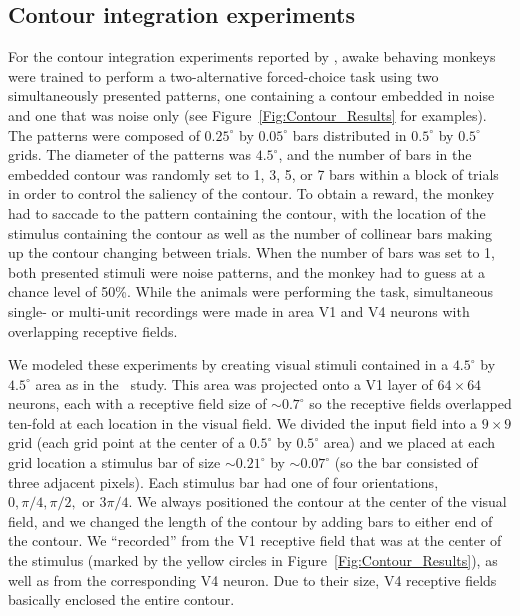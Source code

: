 {\subsection{Contour integration experiments} 
\label{sec:contour_exp}
For the contour integration experiments reported by
\cite{Chen_etal14}, awake behaving
 monkeys were trained to perform a two-alternative
forced-choice task using two simultaneously presented patterns, one
containing a contour embedded in noise and one that was noise only
(see Figure~\ref{Fig:Contour_Results} for examples). 
The patterns
were composed of 
$0.25^{\circ}$ by $0.05^{\circ}$
bars distributed in $0.5^{\circ}$ by $0.5^{\circ}$ grids. 
The diameter
of the patterns was $4.5^{\circ}$, and the number of bars in the
embedded contour was randomly set to 1, 3, 5, or 7 bars within a block
of trials in order to control the saliency of the contour.
To obtain a reward, the
monkey had to saccade to the pattern containing the contour, 
with the location of the stimulus containing the contour as well as the number
of collinear bars making up the contour  changing between trials. 
 When the number of bars was set to 1, both presented stimuli were noise patterns, and the monkey had to guess at a chance level of 50\%. 
 While the animals were performing the task, simultaneous
single- or multi-unit recordings were made in area V1 and V4 neurons with
overlapping receptive fields. 

We modeled these experiments by creating visual stimuli
contained in a $4.5^{\circ}$ by $4.5^{\circ}$ area
as in the~\cite{Chen_etal14}  study. This area was projected onto
a V1 layer of $64 \times 64$ neurons, each with a receptive field
size of $\sim0.7^{\circ}$  
so the receptive fields overlapped ten-fold at each location in the visual
field. 
We divided the input field into a $9 \times 9$ grid (each grid point
at the center of a $0.5^{\circ}$ by $0.5^{\circ}$ area)
and we placed at each grid location a
stimulus bar of size $\sim0.21^{\circ}$ by $\sim0.07^{\circ}$ 
(so the bar consisted of three adjacent pixels).
Each stimulus bar had one of four orientations, 
$0, \pi/4, \pi/2,$ or $3\pi/4$. 
We always positioned the
contour at the center of the  
visual field,
and we changed the length of the
contour by adding bars to either end 
 of the contour. We
``recorded'' from the V1 receptive field that was at the center of the
stimulus (marked by the yellow circles in Figure~\ref{Fig:Contour_Results}),
as well as from the corresponding V4 neuron.
Due to their size, V4 receptive fields
basically enclosed the entire
contour.

}
